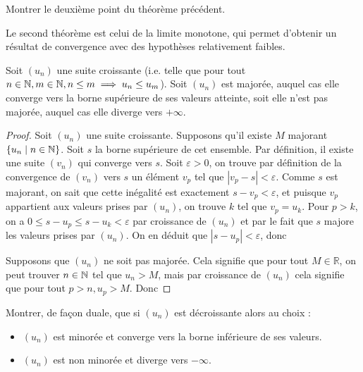 \begin{exo}
    Montrer le deuxième point du théorème précédent.
\end{exo}

Le second théorème est celui de la limite monotone, qui permet d'obtenir un résultat de convergence avec des hypothèses relativement faibles.

\begin{them}
    Soit $(u_n)$ une suite croissante (i.e. telle que pour tout $n\in\mathbb{N},m\in\mathbb{N}, n\leq m \implies u_n\leq u_m$). Soit $(u_n)$ est majorée, auquel cas elle converge vers la borne supérieure de ses valeurs atteinte, soit elle n'est pas majorée, auquel cas elle diverge vers $+\infty$.
\end{them}

\begin{proof}
    Soit $(u_n)$ une suite croissante. Supposons qu'il existe $M$ majorant $\{u_n\;|\;n\in\mathbb{N}\}$. Soit $s$ la borne supérieure de cet ensemble. Par définition, il existe une suite $(v_n)$ qui converge vers $s$. Soit $\varepsilon > 0$, on trouve par définition de la convergence de $(v_n)$ vers $s$ un élément $v_p$ tel que $|v_p - s| < \varepsilon$. Comme $s$ est majorant, on sait que cette inégalité est exactement $s-v_p < \varepsilon$, et puisque $v_p$ appartient aux valeurs prises par $(u_n)$, on trouve $k$ tel que $v_p = u_k$. Pour $p > k$, on a $0 \leq s-u_p \leq s - u_k < \varepsilon$ par croissance de $(u_n)$ et par le fait que $s$ majore les valeurs prises par $(u_n)$. On en déduit que $|s-u_p| < \varepsilon$, donc 

    Supposons que $(u_n)$ ne soit pas majorée. Cela signifie que pour tout $M\in\mathbb R$, on peut trouver $n\in\mathbb{N}$ tel que $u_n > M$, mais par croissance de $(u_n)$ cela signifie que pour tout $p > n, u_p > M$. Donc 
\end{proof}

\begin{exo}
    Montrer, de façon duale, que si $(u_n)$ est décroissante alors au choix :
    \begin{itemize}[label=$\bullet$]
        \item $(u_n)$ est minorée et converge vers la borne inférieure de ses valeurs.
        \item $(u_n)$ est non minorée et diverge vers $-\infty$.
    \end{itemize}
\end{exo}

